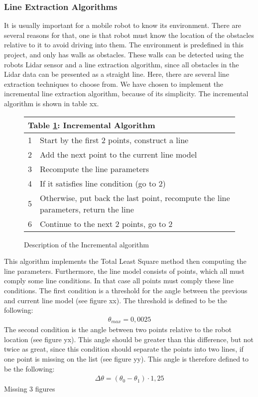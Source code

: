 \documentclass[../Head/Main.tex]{subfiles}
\begin{document}
\subsubsection{Line Extraction Algorithms}
It is usually important for a mobile robot to know its environment. There are several reasons for that, one is that robot must know the location of the obstacles relative to it to avoid driving into them. The environment is predefined in this project, and only has walls as obstacles. These walls can be detected using the robots Lidar sensor and a line extraction algorithm, since all obstacles in the Lidar data can be presented as a straight line. Here, there are several line extraction techniques to choose from.
We have chosen to implement the incremental line extraction algorithm, because of its simplicity. The incremental algorithm is shown in table xx.\par
\begin{figure}[H]
	\centering
	\begin{tabular}{c l}
		\hline
		\multicolumn{2}{l}{\textbf{Table							\ref{tab:Incremental}: Incremental Algorithm}}  			\\ \hline
		1 & Start by the first 2 points, construct a 				line \\
		2 & Add the next point to the current line model 		\\
		3 & Recompute the line parameters \\
		4 & If it satisfies line condition (go to 2) \\
		5 & Otherwise, put back the last point, 					recompute the line parameters, return the line  			\\
		6 & Continue to the next 2 points, go to 2 \\ 				\hline
	\end{tabular}
	\caption{Description of the Incremental algorithm}
	\label{tab:Incremental}
\end{figure}
This algorithm implements the Total Least Square method then computing the line parameters. Furthermore, the line model consists of points, which all must comply some line conditions. In that case all points must comply these line conditions. The first condition is a threshold for the angle between the previous and current line model (see figure xx). The threshold is defined to be the following:
\begin{align*}
	\theta_{max} = 0,0025
\end{align*}
The second condition is the angle between two points relative to the robot location (see figure yx). This angle should be greater than this difference, but not twice as great, since this condition should separate the points into two lines, if one point is missing on the list (see figure yy). This angle is therefore defined to be the following:
\begin{align*}
	\Delta\theta = \left(\theta_0 - \theta_1\right)\cdot 1,25
\end{align*}
{\color{red} Missing 3 figures} \par
\end{document}
